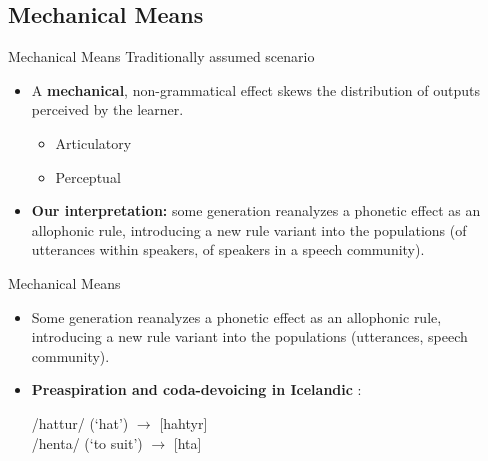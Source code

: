\documentclass[hyperref={pdfpagelabels=false}]{beamer}
\begin{document}
\subsection{Mechanical Means}
\begin{frame}{Mechanical Means}
	Traditionally assumed scenario \citep{Ohala1981} \\
	\begin{itemize}
		\item A \textbf{mechanical}, non-grammatical effect skews the distribution of outputs perceived by the learner.
		\begin{itemize} \pause
			\item Articulatory \pause
			\item Perceptual \pause
		\end{itemize}
		\item \textbf{Our interpretation:} some generation reanalyzes a phonetic effect as an allophonic rule, introducing a new rule variant into the populations (of utterances within speakers, of speakers in a speech community).
	\end{itemize}



\end{frame}

\begin{frame}{Mechanical Means}
	\begin{itemize}
		\item Some generation reanalyzes a phonetic effect as an allophonic rule, introducing a new rule variant into the populations (utterances, speech community).
		\item \textbf{Preaspiration and coda-devoicing in Icelandic} \citep[][]{kristjan1980, kristjan1986}: \\
		\begin{center}
		/hattur/ (`hat') $\rightarrow$ [hahtyr]\\ /henta/ (`to suit') $\rightarrow$ [h\textepsilon{}ta]
		\end{center}
	\end{itemize}

\end{frame}
\end{document}
